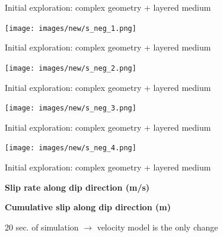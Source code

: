 \documentclass{beamer}
\begin{document}
\begin{frame}
 {Initial exploration: complex geometry + layered medium}
 
 \begin{center}
  \texttt{[image: images/new/s\_neg\_1.png]}
 \end{center}
 
\end{frame}

\begin{frame}
 {Initial exploration: complex geometry + layered medium}
 
 \begin{center}
  \texttt{[image: images/new/s\_neg\_2.png]}
 \end{center}
  \addtocounter{framenumber}{-1}
 
\end{frame}

\begin{frame}
 {Initial exploration: complex geometry + layered medium}
 
 \begin{center}
  \texttt{[image: images/new/s\_neg\_3.png]}
 \end{center}
  \addtocounter{framenumber}{-1}
 
\end{frame}

\begin{frame}
 {Initial exploration: complex geometry + layered medium}
 
 \begin{center}
  \texttt{[image: images/new/s\_neg\_4.png]}
 \end{center}
  \addtocounter{framenumber}{-1}
 
\end{frame}


\begin{frame}
 {Initial exploration: complex geometry + layered medium}
 
 
 \begin{center}
 {\bf Slip rate along dip direction (m/s)}

  {\bf Cumulative slip along dip direction (m)}
  
 \scriptsize 20 sec. of simulation $\rightarrow$ 
  velocity model is the only change
  
 \end{center}
  
\end{frame}
\end{document}

